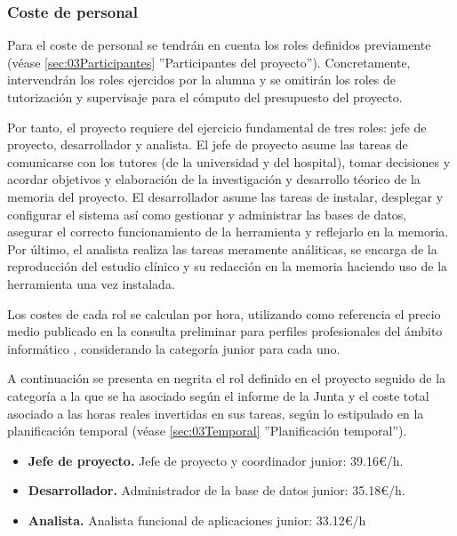 \subsubsection{Coste de personal}

Para el coste de personal se tendrán en cuenta los roles definidos previamente (véase \ref{sec:03Participantes} ''Participantes del proyecto''). Concretamente, intervendrán los roles ejercidos por la alumna y se omitirán los roles de tutorización y supervisaje para el cómputo del presupuesto del proyecto.

Por tanto, el proyecto requiere del ejercicio fundamental de tres roles: jefe de proyecto, desarrollador y analista. El jefe de proyecto asume las tareas de comunicarse con los tutores (de la universidad y del hospital), tomar decisiones y acordar objetivos y elaboración de la investigación y desarrollo téorico de la memoria del proyecto. El desarrollador asume las tareas de instalar, desplegar y configurar el sistema así como gestionar y administrar las bases de datos, asegurar el correcto funcionamiento de la herramienta y reflejarlo en la memoria. Por último, el analista realiza las tareas meramente análiticas, se encarga de la reproducción del estudio clínico y su redacción en la memoria haciendo uso de la herramienta una vez instalada.

Los costes de cada rol se calculan por hora, utilizando como referencia el precio medio publicado en la consulta preliminar para perfiles profesionales del ámbito informático \cite{informeJuntaAndalucia}, considerando la categoría junior para cada uno. 

A continuación se presenta en negrita el rol definido en el proyecto seguido de la categoría a la que se ha asociado según el informe de la Junta y el coste total asociado a las horas reales invertidas en sus tareas, según lo estipulado en la planificación temporal (véase \ref{sec:03Temporal} ''Planificación temporal'').

\begin{itemize}
    \item \textbf{Jefe de proyecto.} Jefe de proyecto y coordinador junior: 39.16€/h.


    \item \textbf{Desarrollador.} Administrador de la base de datos junior: 35.18€/h.


    \item \textbf{Analista.} Analista funcional de aplicaciones junior: 33.12€/h


\end{itemize}

